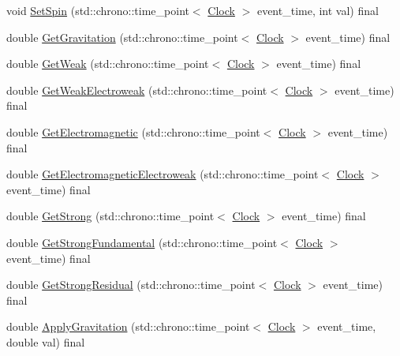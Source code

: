 \begin{DoxyCompactItemize}
\item 
void \mbox{\hyperlink{classLaw_a3de75edea5e20db0a7b731de61f07dea}{Set\+Spin}} (std\+::chrono\+::time\+\_\+point$<$ \mbox{\hyperlink{universe_8h_a0ef8d951d1ca5ab3cfaf7ab4c7a6fd80}{Clock}} $>$ event\+\_\+time, int val) final
\item 
double \mbox{\hyperlink{classLaw_a84bdc0c2ca97a9c19422018ff761b992}{Get\+Gravitation}} (std\+::chrono\+::time\+\_\+point$<$ \mbox{\hyperlink{universe_8h_a0ef8d951d1ca5ab3cfaf7ab4c7a6fd80}{Clock}} $>$ event\+\_\+time) final
\item 
double \mbox{\hyperlink{classLaw_a303c365b7a17997a63a74756fc72fba3}{Get\+Weak}} (std\+::chrono\+::time\+\_\+point$<$ \mbox{\hyperlink{universe_8h_a0ef8d951d1ca5ab3cfaf7ab4c7a6fd80}{Clock}} $>$ event\+\_\+time) final
\item 
double \mbox{\hyperlink{classLaw_aad6e54da64a5d8499dcb6c232aa6748f}{Get\+Weak\+Electroweak}} (std\+::chrono\+::time\+\_\+point$<$ \mbox{\hyperlink{universe_8h_a0ef8d951d1ca5ab3cfaf7ab4c7a6fd80}{Clock}} $>$ event\+\_\+time) final
\item 
double \mbox{\hyperlink{classLaw_a01eba6e68d2d8a717e2b4789be90853d}{Get\+Electromagnetic}} (std\+::chrono\+::time\+\_\+point$<$ \mbox{\hyperlink{universe_8h_a0ef8d951d1ca5ab3cfaf7ab4c7a6fd80}{Clock}} $>$ event\+\_\+time) final
\item 
double \mbox{\hyperlink{classLaw_ae4ccaca7b78905f416f35f9556b1923c}{Get\+Electromagnetic\+Electroweak}} (std\+::chrono\+::time\+\_\+point$<$ \mbox{\hyperlink{universe_8h_a0ef8d951d1ca5ab3cfaf7ab4c7a6fd80}{Clock}} $>$ event\+\_\+time) final
\item 
double \mbox{\hyperlink{classLaw_afd94bf09dbaf5d5df36b8f093db02dd9}{Get\+Strong}} (std\+::chrono\+::time\+\_\+point$<$ \mbox{\hyperlink{universe_8h_a0ef8d951d1ca5ab3cfaf7ab4c7a6fd80}{Clock}} $>$ event\+\_\+time) final
\item 
double \mbox{\hyperlink{classLaw_afcdbea76524e5a52691fff7b526971e9}{Get\+Strong\+Fundamental}} (std\+::chrono\+::time\+\_\+point$<$ \mbox{\hyperlink{universe_8h_a0ef8d951d1ca5ab3cfaf7ab4c7a6fd80}{Clock}} $>$ event\+\_\+time) final
\item 
double \mbox{\hyperlink{classLaw_a70fb2a7710776c4e2315a1e29fe35eb6}{Get\+Strong\+Residual}} (std\+::chrono\+::time\+\_\+point$<$ \mbox{\hyperlink{universe_8h_a0ef8d951d1ca5ab3cfaf7ab4c7a6fd80}{Clock}} $>$ event\+\_\+time) final
\item 
double \mbox{\hyperlink{classLaw_a04efdc724335219ab0affdcffb55eea2}{Apply\+Gravitation}} (std\+::chrono\+::time\+\_\+point$<$ \mbox{\hyperlink{universe_8h_a0ef8d951d1ca5ab3cfaf7ab4c7a6fd80}{Clock}} $>$ event\+\_\+time, double val) final

\end{DoxyCompactItemize}
